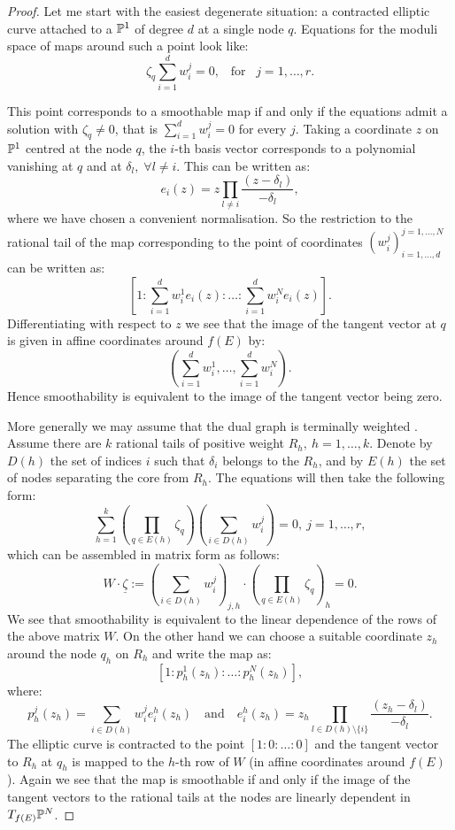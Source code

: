 \begin{proof}
 Let me start with the easiest degenerate situation: a contracted elliptic curve attached to a $\mathbb P^1$ of degree $d$ at a single node $q$. Equations for the moduli space of maps around such a point look like: 
 \[\zeta_q\sum_{i=1}^d w_i^j=0,\;\;\;\text{for} \;\;\;j=1,\ldots,r.\]
 
 
  This point corresponds to a smoothable map if and only if the equations admit a solution with $\zeta_q\neq 0$, that is $\sum_{i=1}^d w_i^j=0$ for every $j$. Taking a coordinate $z$ on  $\mathbb P^1$ centred at the node $q$,   the $i$-th basis vector corresponds to a polynomial vanishing at $q$ and at $\delta_l,\;\forall l\neq i$. This can be written as:
  \[e_i(z)=z\prod_{l\neq i}\frac{(z-\delta_l)}{-\delta_l},\] 
  where we have chosen a convenient normalisation. So the restriction to the rational tail of the map corresponding to the point of coordinates $(w_i^j)_{i=1,\ldots,d}^{j=1,\ldots,N}$ can be written as:
  \[[1:\sum_{i=1}^d w_i^1e_i(z):\ldots:\sum_{i=1}^d w_i^Ne_i(z)].\] 
  Differentiating with respect to $z$ we see that the image of the tangent vector at $q$ is given in affine coordinates around $f(E)$ by:
  \[(\sum_{i=1}^d w_i^1,\ldots,\sum_{i=1}^d w_i^N).\] 
  Hence smoothability is equivalent to the image of the tangent vector being zero.
 
 More generally we may assume that the dual graph is terminally weighted \cite[\S 3.1]{HL}. Assume there are $k$  rational tails of positive weight $R_h,\ h=1,\ldots,k$. Denote by $D(h)$ the set of indices $i$ such that $\delta_i$ belongs to the $R_h$, and by $E(h)$ the set of nodes separating the core from $R_h$. The equations will then take the following form:
 \[\sum_{h=1}^k\left(\prod_{q\in E(h)}\zeta_q\right)\left(\sum_{i\in D(h)}w_i^j\right)=0,\ j=1,\ldots,r,\]
 which can be assembled in matrix form as follows:
 $$W\cdot\underline\zeta:=\left(\sum_{i\in D(h)}w_i^j\right)_{j,h}\cdot\left(\prod_{q\in E(h)}\zeta_q\right)_h=0.$$
 We see that smoothability is equivalent to the linear dependence of the rows of the above matrix $W$. On the other hand we can choose a suitable coordinate $z_h$ around the node $q_h$ on $R_h$ and write the map as: 
 \[[1:p_h^1(z_h):\ldots:p_h^N(z_h)],\]
  where: 
 \[p_h^j(z_h)=\sum_{i\in D(h)}w_i^je_i^h(z_h) \quad \text{and} \quad e_i^h(z_h)=z_h\prod_{l\in D(h)\setminus\{i\}}\frac{(z_h-\delta_l)}{-\delta_l}.\] The elliptic curve is contracted to the point $[1:0:\ldots:0]$ and the tangent vector to $R_h$ at $q_h$ is mapped to the $h$-th row of $W$ (in affine coordinates around $f(E)$). Again we see that the map is smoothable if and only if the image of the tangent vectors to the rational tails at the nodes are linearly dependent in $T_{f(E)}\mathbb P^N$.
 \end{proof}

